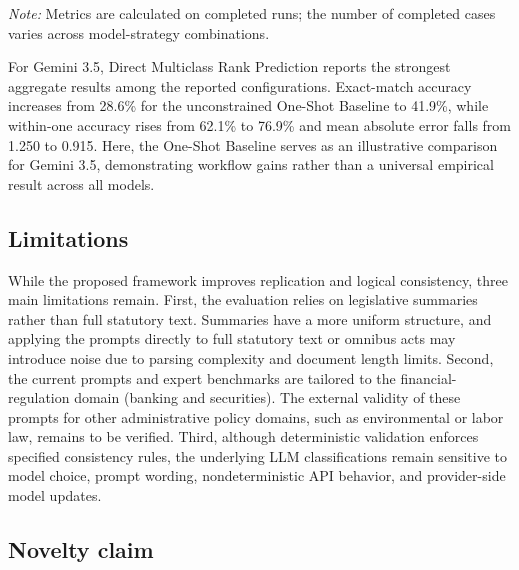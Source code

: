 \documentclass[runningheads]{llncs}
\begin{document}
\begin{table}[t]
\begin{threeparttable}
\begin{tablenotes}
\scriptsize
\item[] \textit{Note:} Metrics are calculated on completed runs; the number of completed cases varies across model-strategy combinations.
\end{tablenotes}

\end{threeparttable}
\end{table}


For Gemini 3.5, Direct Multiclass Rank Prediction reports the strongest aggregate results among the reported configurations. Exact-match accuracy increases from 28.6\% for the unconstrained One-Shot Baseline to 41.9\%, while within-one accuracy rises from 62.1\% to 76.9\% and mean absolute error falls from 1.250 to 0.915. Here, the One-Shot Baseline serves as an illustrative comparison for Gemini 3.5, demonstrating workflow gains rather than a universal empirical result across all models.



\subsection{Limitations}

While the proposed framework improves replication and logical consistency, three main limitations remain. First, the evaluation relies on legislative summaries rather than full statutory text. Summaries have a more uniform structure, and applying the prompts directly to full statutory text or omnibus acts may introduce noise due to parsing complexity and document length limits. Second, the current prompts and expert benchmarks are tailored to the financial-regulation domain (banking and securities). The external validity of these prompts for other administrative policy domains, such as environmental or labor law, remains to be verified. Third, although deterministic validation enforces specified consistency rules, the underlying LLM classifications remain sensitive to model choice, prompt wording, nondeterministic API behavior, and provider-side model updates.

\subsection{Novelty claim}
\end{document}
